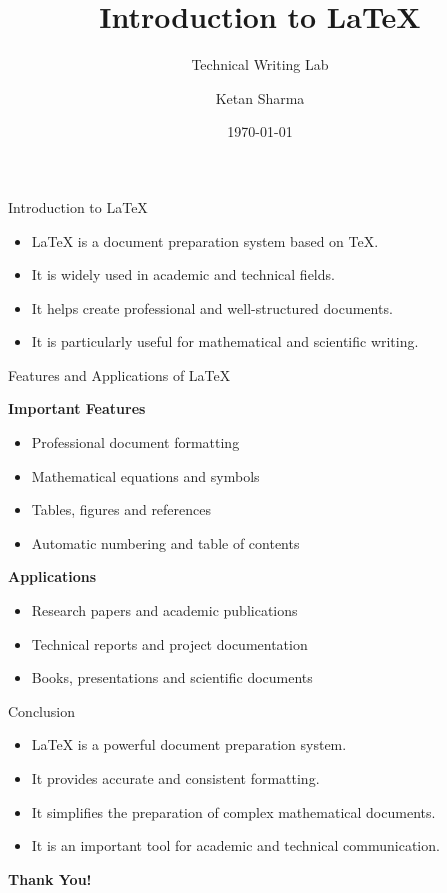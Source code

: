\documentclass[aspectratio=169,12pt]{beamer}
\title{\textbf{Introduction to LaTeX}}
\subtitle{Technical Writing Lab}
\author{Ketan Sharma}
\institute{2025UCP1398}
\date{\today}
\begin{document}
	
	\begin{frame}
		\titlepage
	\end{frame}
	
	\begin{frame}{Introduction to LaTeX}
		
		\begin{itemize}
			\item LaTeX is a document preparation system based on TeX.
			\item It is widely used in academic and technical fields.
			\item It helps create professional and well-structured documents.
			\item It is particularly useful for mathematical and scientific writing.
		\end{itemize}
		
	\end{frame}
	
	\begin{frame}{Features and Applications of LaTeX}
		
		\textbf{Important Features}
		
		\begin{itemize}
			\item Professional document formatting
			\item Mathematical equations and symbols
			\item Tables, figures and references
			\item Automatic numbering and table of contents
		\end{itemize}
		
		\vspace{0.3cm}
		
		\textbf{Applications}
		
		\begin{itemize}
			\item Research papers and academic publications
			\item Technical reports and project documentation
			\item Books, presentations and scientific documents
		\end{itemize}
		
	\end{frame}
	
	\begin{frame}{Conclusion}
		
		\begin{itemize}
			\item LaTeX is a powerful document preparation system.
			\item It provides accurate and consistent formatting.
			\item It simplifies the preparation of complex mathematical documents.
			\item It is an important tool for academic and technical communication.
		\end{itemize}
		
		\vspace{0.8cm}
		
		\begin{center}
			{\Large\textbf{Thank You!}}
		\end{center}
		
	\end{frame}
	
\end{document}
